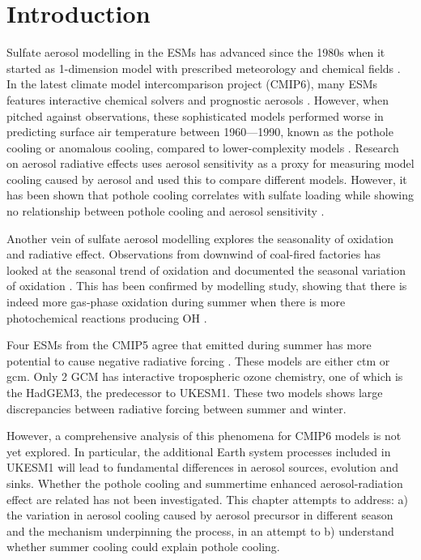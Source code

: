 \section{Introduction}
\label{ch4:intro}

Sulfate aerosol modelling in the ESMs has advanced since the 1980s when it started as 1-dimension model with prescribed meteorology and chemical fields \citep[e.g. ][]{ericksoniiiGlobalOceantoatmosphereDimethyl1990} . In the latest climate  model intercomparison project (CMIP6), many ESMs features interactive chemical solvers and prognostic aerosols \citep{zhangRoleAnthropogenicAerosols2021}. However, when pitched against observations, these sophisticated models performed worse in predicting surface air temperature between 1960—1990, known as the pothole cooling or anomalous cooling, compared to lower-complexity models \citep{zhangRoleAnthropogenicAerosols2021}. Research on aerosol radiative effects uses aerosol sensitivity as a proxy for measuring model cooling caused by aerosol and used this to compare different models. However, it has been shown that pothole cooling correlates with sulfate loading while showing no relationship between pothole cooling and aerosol sensitivity \citep{zhangRoleAnthropogenicAerosols2021}.

Another vein of sulfate aerosol modelling explores the seasonality of  oxidation and radiative effect. Observations from downwind of coal-fired factories has looked at the seasonal trend of  oxidation and documented the seasonal variation of oxidation  \citep{meagherSeasonalVariationAtmospheric1983}. This has been confirmed by modelling study, showing that there is indeed more gas-phase oxidation during summer when there is more photochemical reactions producing OH \citep{meagherSeasonalVariationAtmospheric1983,eatoughConversionSO2Sulfate1994}.

Four ESMs from the CMIP5 agree that  emitted during summer has more potential to cause negative radiative forcing \citep{bellouinRegionalSeasonalRadiative2016}. These models are either ctm or gcm. Only 2 GCM has interactive tropospheric ozone chemistry, one of which is the HadGEM3, the predecessor to UKESM1. These two models shows large discrepancies between radiative forcing between summer and winter. 

However, a comprehensive analysis of this phenomena for CMIP6 models is not yet explored. In particular, the additional Earth system processes included in UKESM1 will lead to fundamental differences in aerosol sources, evolution and sinks. Whether the pothole cooling and summertime enhanced aerosol-radiation effect are related has not been investigated. This chapter attempts to address: a)  the variation in aerosol cooling caused by aerosol precursor in different season and the mechanism underpinning the process, in an attempt to b) understand whether summer cooling could explain pothole cooling.


